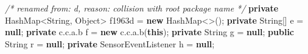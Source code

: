 \documentclass[
]{article}
\newenvironment{Shaded}{}{}
\newcommand{\BuiltInTok}[1]{\textcolor[rgb]{0.00,0.50,0.00}{#1}}
\newcommand{\CommentTok}[1]{\textcolor[rgb]{0.38,0.63,0.69}{\textit{#1}}}
\newcommand{\FunctionTok}[1]{\textcolor[rgb]{0.02,0.16,0.49}{#1}}
\newcommand{\KeywordTok}[1]{\textcolor[rgb]{0.00,0.44,0.13}{\textbf{#1}}}
\newcommand{\NormalTok}[1]{#1}
\newcommand{\OperatorTok}[1]{\textcolor[rgb]{0.40,0.40,0.40}{#1}}
\begin{document}
\begin{Shaded}
\begin{Highlighting}[]
    \CommentTok{/* renamed from: d, reason: collision with root package name */}
    \KeywordTok{private} \BuiltInTok{HashMap}\OperatorTok{\textless{}}\BuiltInTok{String}\OperatorTok{,} \BuiltInTok{Object}\OperatorTok{\textgreater{}}\NormalTok{ f1963d }\OperatorTok{=} \KeywordTok{new} \BuiltInTok{HashMap}\OperatorTok{\textless{}\textgreater{}();}
    \KeywordTok{private} \BuiltInTok{String}\OperatorTok{[]}\NormalTok{ e }\OperatorTok{=} \KeywordTok{null}\OperatorTok{;}
    \KeywordTok{private}\NormalTok{ c}\OperatorTok{.}\FunctionTok{c}\OperatorTok{.}\FunctionTok{a}\OperatorTok{.}\FunctionTok{b}\NormalTok{ f }\OperatorTok{=} \KeywordTok{new}\NormalTok{ c}\OperatorTok{.}\FunctionTok{c}\OperatorTok{.}\FunctionTok{a}\OperatorTok{.}\FunctionTok{b}\OperatorTok{(}\KeywordTok{this}\OperatorTok{);}
    \KeywordTok{private} \BuiltInTok{String}\NormalTok{ g }\OperatorTok{=} \KeywordTok{null}\OperatorTok{;}
    \KeywordTok{public} \BuiltInTok{String}\NormalTok{ r }\OperatorTok{=} \KeywordTok{null}\OperatorTok{;}
    \KeywordTok{private}\NormalTok{ SensorEventListener h }\OperatorTok{=} \KeywordTok{null}\OperatorTok{;}


\end{Highlighting}
\end{Shaded}
\end{document}
